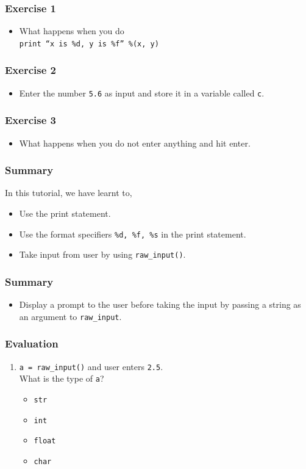 \documentclass[17pt]{beamer}
\newcounter{saveenumi}
\newcommand{\seti}{\setcounter{saveenumi}{\value{enumi}}}
\begin{document}
\begin{frame}
\frametitle{Exercise 1}
\label{sec-3}


\begin{itemize}
\item What happens when you do\\
  \texttt{print ``x is \%d, y is \%f''  \%(x, y)}
\end{itemize}
\end{frame}
\begin{frame}
\frametitle{Exercise 2}
\label{sec-4}


\begin{itemize}
\item Enter the number \texttt{5.6} as input and store it in a variable called
  \texttt{c}.
\end{itemize}
\end{frame}

\begin{frame}
\frametitle{Exercise 3}
\label{sec-5}


\begin{itemize}
\item What happens when you do not enter anything and hit enter.
\end{itemize}
\end{frame}
\begin{frame}
\frametitle{Summary}
\label{sec-7}

 In this tutorial, we have learnt to,


\begin{itemize}
\item Use the print statement.\pause
\item Use the format specifiers \texttt{\%d, \%f, \%s} in the print statement.\pause
\item Take input from user by using \texttt{raw\_input()}.
\end{itemize}
\end{frame}
\begin{frame}
\frametitle{Summary}
\label{sec-7}
\begin{itemize}
\item Display a prompt to the user before taking the input by passing 
    a string as an argument to \texttt{raw\_input}.
\end{itemize}
\end{frame}

\begin{frame}
\frametitle{Evaluation}
\label{sec-8.1}
\begin{enumerate}
\item \texttt{a = raw\_input()} and user enters \texttt{2.5}.\\\pause
   What is the type of \texttt{a}?\pause
\begin{itemize}
\item \texttt{str}
\item \texttt{int}
\item \texttt{float}
\item \texttt{char}
\end{itemize}
\seti
\end{enumerate}
\end{frame}
\end{document}
